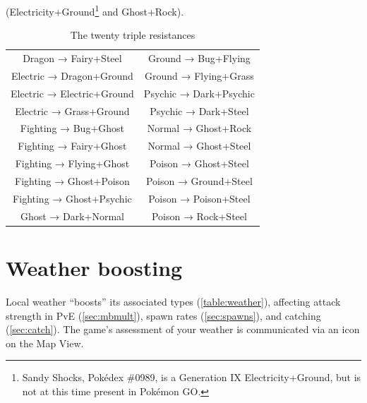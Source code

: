   (Electricity+Ground\footnote{Sandy Shocks, Pokédex \#0989, is a Generation IX
  Electricity+Ground, but is not at this time present in Pokémon GO.} and Ghost+Rock).
\begin{table}
  \begin{center}
    \begin{tabular}{cc}
Dragon → Fairy+Steel & Ground → Bug+Flying \\
Electric → Dragon+Ground & Ground → Flying+Grass \\
Electric → Electric+Ground & Psychic → Dark+Psychic \\
Electric → Grass+Ground & Psychic → Dark+Steel \\
Fighting → Bug+Ghost & Normal → Ghost+Rock \\
Fighting → Fairy+Ghost & Normal → Ghost+Steel \\
Fighting → Flying+Ghost & Poison → Ghost+Steel \\
Fighting → Ghost+Poison & Poison → Ground+Steel \\
Fighting → Ghost+Psychic & Poison → Poison+Steel \\
Ghost → Dark+Normal & Poison → Rock+Steel \\
    \end{tabular}
    \caption{The twenty triple resistances\label{table:triples}}
  \end{center}
\end{table}

\section{Weather boosting\label{sec:weather}}
Local weather ``boosts'' its associated types (\autoref{table:weather}), affecting attack strength
 in PvE (\autoref{sec:mbmult}),
 spawn rates (\autoref{sec:spawns}), and catching (\autoref{sec:catch}).
The game's assessment of your weather is communicated via an icon on the Map View.
\begin{table}

\end{table}
